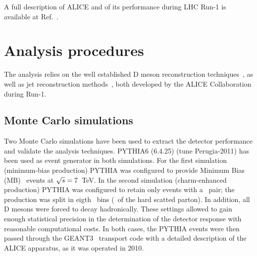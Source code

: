 \documentclass[a4paper]{jpconf}
\begin{document}
A full description of ALICE and of its performance during LHC Run-1 is available at Ref.~\cite{ALICE:2014b}.

\section{Analysis procedures}
The analysis relies on the well established D meson reconstruction techniques~\cite{ALICE:2012d, ALICE:2016a}, as well as
jet reconstruction methods~\cite{ALICE:2013c, ALICE:2015a, ALICE:2015e}, both developed by the ALICE Collaboration during Run-1.

\subsection{Monte Carlo simulations}
Two Monte Carlo simulations have been used to extract the detector performance and validate the analysis techniques.
PYTHIA6 (6.4.25)\cite{Sjostrand:2006} (tune Perugia-2011) has been used as event generator in both simulations.
For the first simulation (minimum-bias production) PYTHIA was configured to provide Minimum Bias (MB) \pp\ events at $\sqrt{s}=7$~TeV.
In the second simulation (charm-enhanced production) PYTHIA was configured to retain only events with a \ccbar\ pair; the production
was split in eigth \pthard\ bins (\pT\ of the hard scatted parton). In addition, all D mesons were forced
to decay hadronically. These settings allowed to gain enough statistical precision in the determination of the detector response with reasonable
computational costs.
In both cases, the PYTHIA events were then passed through the GEANT3~\cite{GEANT3-url} transport code with a detailed description of the ALICE apparatus,
as it was operated in 2010.
\end{document}
